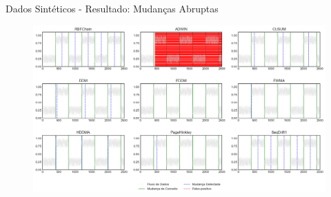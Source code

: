 \documentclass[10pt]{beamer}
\begin{document}
\begin{frame}{Dados Sintéticos - Resultado: Mudanças Abruptas}
    \begin{figure}[t]
        \begin{center}
            \includegraphics[width=\textwidth]{imagens/abrupt.png}
        \end{center}
    \end{figure}
\end{frame}
\end{document}
